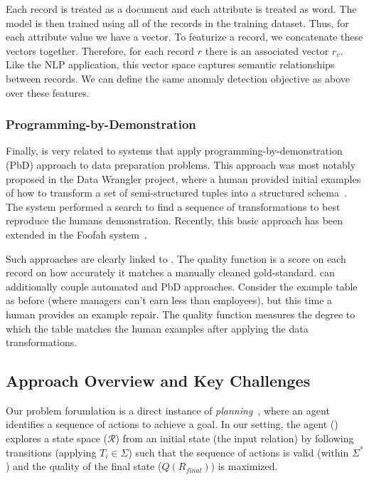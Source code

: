 Each record is treated as a document and each attribute is treated as word.
 The model is then trained using all of the records in the training dataset.
 Thus, for each attribute value we have a vector.
 To featurize a record, we concatenate these vectors together.
 Therefore, for each record $r$ there is an associated vector $r_v$.
  Like the NLP application, this vector space captures semantic relationships between records.
  We can define the same anomaly detection objective as above over these features.
\fi
  
\subsubsection{Programming-by-Demonstration}
Finally, \sys is very related to systems that apply programming-by-demonstration (PbD) approach to data preparation problems.
This approach was most notably proposed in the Data Wrangler project, where a human provided initial examples of how to transform a set of semi-structured tuples into a structured schema~\cite{wrangler,trifacta}.
The system performed a search to find a sequence of transformations to best reproduce the humans demonstration.
Recently, this basic approach has been extended in the Foofah system~\cite{jin2017foofah}.

Such approaches are clearly linked to \sys. The quality function is a score on each record on how accurately it matches a manually cleaned gold-standard. \sys can additionally couple automated and PbD approaches. 
Consider the example table as before (where managers can't earn less than employees), but this time  a human provides an example repair.
The quality function measures the degree to which the table matches the human examples after applying the data transformations.












\subsection{Approach Overview and Key Challenges}

Our problem forumlation is a direct instance of {\it planning}~\cite{planningbook}, where an agent identifies a sequence of actions to achieve a goal.   In our setting, the agent (\sys) explores a state space ($\mathcal{R}$) from an initial state (the input relation) by following transitions (applying $T_i \in \Sigma$) such that the sequence of actions is valid (within $\Sigma^*$) and the quality of the final state ($Q(R_{final})$) is maximized.  

